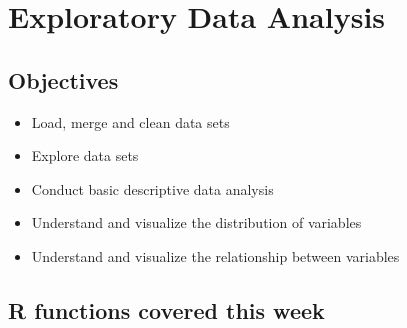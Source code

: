 \documentclass[
]{book}
\providecommand{\tightlist}{%
  \setlength{\itemsep}{0pt}\setlength{\parskip}{0pt}}
\begin{document}
\hypertarget{eda-1}{%
\chapter{Exploratory Data Analysis}\label{eda-1}}

\hypertarget{objectives}{%
\section{Objectives}\label{objectives}}

\begin{itemize}
\tightlist
\item
  Load, merge and clean data sets
\item
  Explore data sets
\item
  Conduct basic descriptive data analysis
\item
  Understand and visualize the distribution of variables
\item
  Understand and visualize the relationship between variables
\end{itemize}

\hypertarget{r-functions-covered-this-week}{%
\section{R functions covered this week}\label{r-functions-covered-this-week}}
\end{document}
